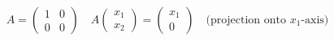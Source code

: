 \begin{eg}
\begin{enumerate}[label=$\arabic*^\circ$]
        \[
            A = \begin{pmatrix}
                1 & 0 \\
                0 & 0
            \end{pmatrix} \quad A\begin{pmatrix}
                x_1 \\ x_2
            \end{pmatrix} = \begin{pmatrix}
                x_1 \\ 0
            \end{pmatrix} \quad \text{(projection onto $x_1$-axis)}
        \]
    \end{enumerate}
\end{eg}

\newpage